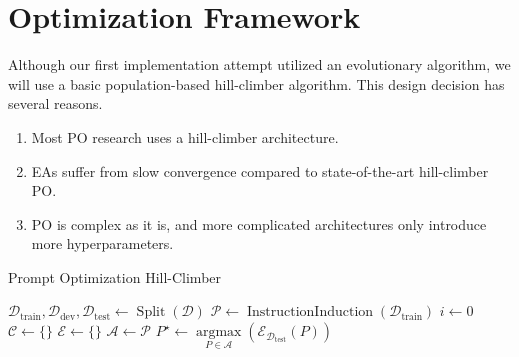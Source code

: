 \section{Optimization Framework}
Although our first implementation attempt utilized an evolutionary algorithm, we will use a basic population-based hill-climber algorithm.
This design decision has several reasons.
\begin{enumerate}
    \item Most PO research uses a hill-climber architecture.
    \item EAs suffer from slow convergence compared to state-of-the-art hill-climber PO\cite{xiang2025selfsupervisedpromptoptimization}.
    \item PO is complex as it is, and more complicated architectures only introduce more hyperparameters.
\end{enumerate}


\begin{algorithm}
    \caption{Prompt Optimization Hill-Climber}
    \label{alg:promptoptimloop}
    $\mathcal{D}_{\text{train}}, \mathcal{D}_{\text{dev}}, \mathcal{D}_{\text{test}} \gets \operatorname{Split}(\mathcal{D})$ 
    $\mathscr{P} \gets \operatorname{InstructionInduction}(\mathcal{D}_{\text{train}})$ 
    $i \gets 0$ 
    $\mathcal{C} \gets \{\}$  
    $\mathcal{E} \gets \{\}$ 
    $\mathcal{A} \gets \mathscr{P}$ 
    $P^{\star} \gets \underset{P\in\mathcal{A}}{\operatorname{argmax}}(\mathcal{E}_{\mathcal{D}_{\text{test}}}(P))$\\
\end{algorithm}

